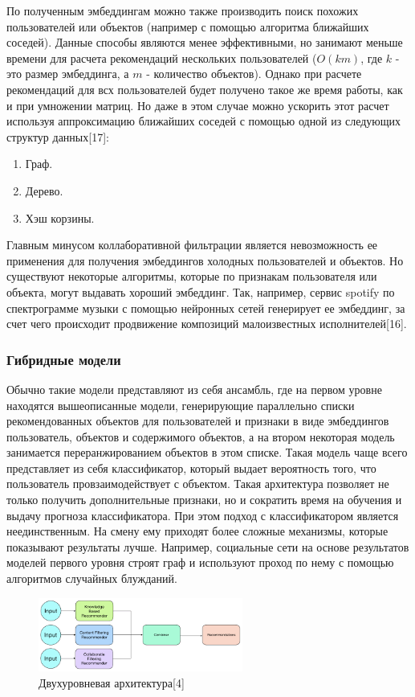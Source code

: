 \documentclass[bachelor, och, coursework]{SCWorks}
\begin{document}
По полученным эмбеддингам можно также производить поиск похожих пользователей или объектов (например с
помощью алгоритма ближайших соседей). Данные способы являются менее эффективными, но занимают меньше
времени для расчета рекомендаций нескольких пользователей ($O(km)$, где $k$ - это размер эмбеддинга,
а $m$ - количество объектов). Однако при расчете рекомендаций для всх пользователей будет получено
такое же время работы, как и при умножении матриц. Но даже в этом случае можно ускорить этот расчет
используя аппроксимацию ближайших соседей с помощью одной из следующих структур данных[17]:

\begin{enumerate}
    \item Граф.
    \item Дерево.
    \item Хэш корзины.
\end{enumerate}

Главным минусом коллаборативной фильтрации является невозможность ее применения для получения эмбеддингов холодных
пользователей и объектов. Но существуют некоторые алгоритмы, которые по признакам пользователя или объекта,
могут выдавать хороший эмбеддинг. Так, например, сервис spotify по спектрограмме музыки с помощью нейронных сетей
генерирует ее эмбеддинг, за счет чего происходит продвижение композиций малоизвестных исполнителей[16].

\subsubsection{Гибридные модели}
Обычно такие модели представляют из себя ансамбль, где на первом уровне находятся вышеописанные модели,
генерирующие параллельно списки рекомендованных объектов для пользователей и признаки в виде эмбеддингов
пользователь, объектов и содержимого объектов, а на втором некоторая модель занимается переранжированием объектов в этом списке.
Такая модель чаще всего представляет из себя классификатор, который выдает вероятность того, что пользователь провзаимодействует
с объектом. Такая архитектура позволяет не только получить дополнительные признаки, но и сократить время
на обучения и выдачу прогноза классификатора. При этом подход с классификатором является неединственным.
На смену ему приходят более сложные механизмы, которые показывают результаты лучше. Например, социальные
сети на основе результатов моделей первого уровня строят граф и используют проход по нему с помощью
алгоритмов случайных блужданий.

\begin{figure}[H]
    \centering
    \includegraphics[width=0.6\textwidth]{pic/4}
    \caption{Двухуровневая архитектура[4]}
    \label{fig:img1}
\end{figure}
\end{document}
